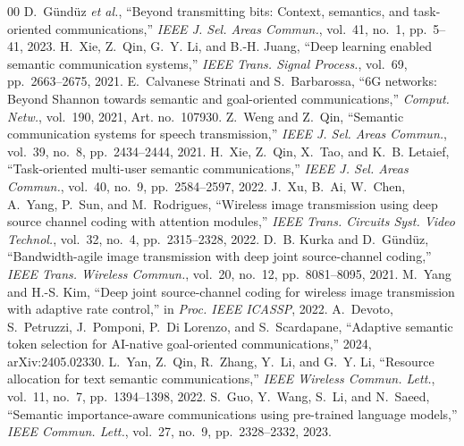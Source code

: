 \documentclass[conference]{IEEEtran}
\begin{document}
\begin{thebibliography}{00}
 D.~G\"und\"uz \emph{et al.}, ``Beyond transmitting bits: Context, semantics, and task-oriented communications,'' \emph{IEEE J. Sel. Areas Commun.}, vol.~41, no.~1, pp.~5--41, 2023.
 H.~Xie, Z.~Qin, G.~Y. Li, and B.-H. Juang, ``Deep learning enabled semantic communication systems,'' \emph{IEEE Trans. Signal Process.}, vol.~69, pp.~2663--2675, 2021.
 E.~Calvanese Strinati and S.~Barbarossa, ``6G networks: Beyond Shannon towards semantic and goal-oriented communications,'' \emph{Comput. Netw.}, vol.~190, 2021, Art. no.~107930.
 Z.~Weng and Z.~Qin, ``Semantic communication systems for speech transmission,'' \emph{IEEE J. Sel. Areas Commun.}, vol.~39, no.~8, pp.~2434--2444, 2021.
 H.~Xie, Z.~Qin, X.~Tao, and K.~B. Letaief, ``Task-oriented multi-user semantic communications,'' \emph{IEEE J. Sel. Areas Commun.}, vol.~40, no.~9, pp.~2584--2597, 2022.
 J.~Xu, B.~Ai, W.~Chen, A.~Yang, P.~Sun, and M.~Rodrigues, ``Wireless image transmission using deep source channel coding with attention modules,'' \emph{IEEE Trans. Circuits Syst. Video Technol.}, vol.~32, no.~4, pp.~2315--2328, 2022.
 D.~B. Kurka and D.~G\"und\"uz, ``Bandwidth-agile image transmission with deep joint source-channel coding,'' \emph{IEEE Trans. Wireless Commun.}, vol.~20, no.~12, pp.~8081--8095, 2021.
 M.~Yang and H.-S. Kim, ``Deep joint source-channel coding for wireless image transmission with adaptive rate control,'' in \emph{Proc. IEEE ICASSP}, 2022.
 A.~Devoto, S.~Petruzzi, J.~Pomponi, P.~Di Lorenzo, and S.~Scardapane, ``Adaptive semantic token selection for AI-native goal-oriented communications,'' 2024, arXiv:2405.02330.
 L.~Yan, Z.~Qin, R.~Zhang, Y.~Li, and G.~Y. Li, ``Resource allocation for text semantic communications,'' \emph{IEEE Wireless Commun. Lett.}, vol.~11, no.~7, pp.~1394--1398, 2022.
 S.~Guo, Y.~Wang, S.~Li, and N.~Saeed, ``Semantic importance-aware communications using pre-trained language models,'' \emph{IEEE Commun. Lett.}, vol.~27, no.~9, pp.~2328--2332, 2023.

\end{thebibliography}
\end{document}
